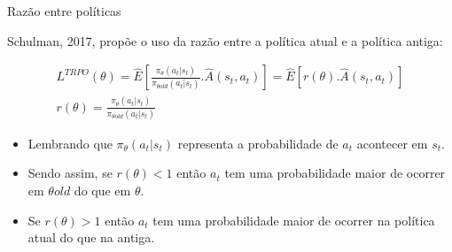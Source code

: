 \documentclass{beamer}
\begin{document}


\begin{frame}{Razão entre políticas}
	
	Schulman, 2017, propõe o uso da razão entre a política atual e a política antiga: 
	
	\begin{eqnarray}
	L^{TRPO}(\theta) = \hat{E} \left[\frac{\pi_{\theta}(a_{t}|s_{t})}{\pi_{\theta old}(a_{t}|s_{t})}.\hat{A}(s_{t},a_{t}) \right] = \hat{E}  \left[ r(\theta). \hat{A}(s_{t},a_{t}) \right] \\	
	r(\theta) = \frac{\pi_{\theta}(a_{t}|s_{t})}{\pi_{\theta old}(a_{t}|s_{t})} 
	\end{eqnarray}


\begin{itemize}
	\item Lembrando que $\pi_{\theta}(a_{t}|s_{t})$ representa a probabilidade de $a_{t}$ acontecer em $s_{t}$.
	\item Sendo assim, se $r(\theta) < 1$ então $a_{t}$ tem uma probabilidade maior de ocorrer em $\theta old$ do que em $\theta$.
	\item Se $r(\theta) > 1$ então $a_{t}$ tem uma probabilidade maior de ocorrer na política atual do que na antiga. 
\end{itemize}

\end{frame}
\end{document}
